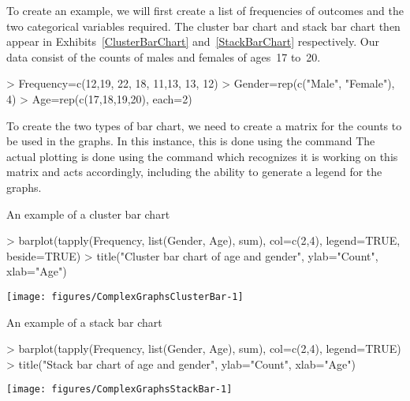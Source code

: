 To create an example, we will first create a list of frequencies of outcomes and the two categorical variables required. The cluster bar chart and stack bar chart then appear in Exhibits~\ref{ClusterBarChart} and~\ref{StackBarChart} respectively. Our data consist of the counts of males and females of ages~17 to~20. 
\begin{Schunk}
\begin{Sinput}
> Frequency=c(12,19, 22, 18, 11,13, 13, 12) 
> Gender=rep(c("Male", "Female"), 4) 
> Age=rep(c(17,18,19,20), each=2) 
\end{Sinput}
\end{Schunk}
To create the two types of bar chart, we need to create a matrix for the counts to be used in the graphs. In this instance, this is done using the  command The actual plotting is done using the  command which recognizes it is working on this matrix and acts accordingly, including the ability to generate a legend for the graphs. 
\begin{exhibit} 
\begin{center} 
\caption{An example of a cluster bar chart} 
\label{ClusterBarChart} 
\begin{Schunk}
\begin{Sinput}
> barplot(tapply(Frequency, list(Gender, Age), sum), col=c(2,4), legend=TRUE, beside=TRUE) 
> title("Cluster bar chart of age and gender", ylab="Count", xlab="Age") 
\end{Sinput}

\texttt{[image: figures/ComplexGraphsClusterBar-1]} \end{Schunk}
\end{center} 
\end{exhibit} 
\begin{exhibit} 
\begin{center} 
\caption{An example of a stack bar chart} 
\label{StackBarChart} 
\begin{Schunk}
\begin{Sinput}
> barplot(tapply(Frequency, list(Gender, Age), sum), col=c(2,4), legend=TRUE) 
> title("Stack bar chart of age and gender", ylab="Count", xlab="Age") 
\end{Sinput}

\texttt{[image: figures/ComplexGraphsStackBar-1]} \end{Schunk}
\end{center} 
\end{exhibit} 
 
